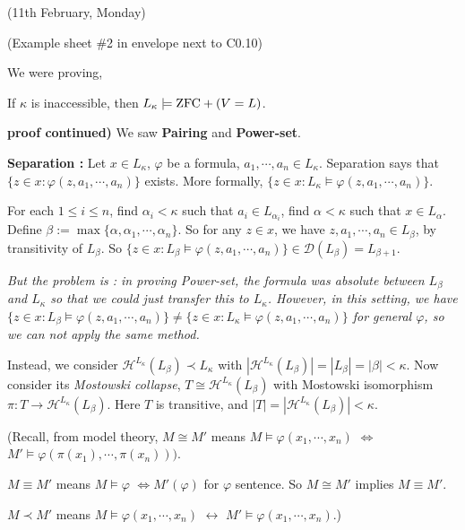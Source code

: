 \documentclass[12pt,a4paper]{article}
\newenvironment{proof}
{\begin{changemargin}{0.5cm}{0.5cm} 
	}%
	{\end{changemargin}
}
\newenvironment{p}
{\begin{proof} 
	}%
	{\end{proof}
}
\begin{document}
\newday

(11th February, Monday)
\s

(Example sheet \#2 in envelope next to C0.10)
\s

We were proving,

\thm If $\kappa$ is inaccessible, then $L_{\kappa} \models \text{ZFC} + (V=L)$.
\begin{p}
\textbf{proof continued)} We saw \textbf{Pairing} and \textbf{Power-set}.
\s

\textbf{Separation :} Let $x\in L_{\kappa}$, $\varphi$ be a formula, $a_1, \cdots, a_n \in L_{\kappa}$. Separation says that $\{z\in x : \varphi(z, a_1, \cdots, a_n) \}$ exists. More formally, $\{ z\in x : L_{\kappa} \models \varphi(z, a_1, \cdots, a_n) \}$.

\quad For each $1\leq i\leq n$, find $\alpha_i < \kappa$ such that $a_i \in L_{\alpha_i}$, find $\alpha < \kappa$ such that $x\in L_{\alpha}$. Define $\beta := \max \{ \alpha, \alpha_1, \cdots, \alpha_n \}$. So for any $z\in x$, we have $z, a_1, \cdots, a_n \in L_{\beta}$, by transitivity of $L_{\beta}$. So $\{ z\in  x : L_{\beta} \models \varphi(z, a_1, \cdots, a_n) \} \in \mathscr{D}(L_{\beta}) = L_{\beta+1}$.

\quad \emph{But the problem is : in proving Power-set, the formula was absolute between $L_{\beta}$ and $L_{\kappa}$ so that we could just transfer this to $L_{\kappa}$. However, in this setting, we have $\{ z \in x: L_{\beta} \models \varphi(z, a_1, \cdots, a_n) \} \neq \{ z\in x : L_{\kappa}\models \varphi(z, a_1, \cdots, a_n) \}$  for general $\varphi$, so we can not apply the same method.}

\quad Instead, we consider $\mathcal{H}^{L_{\kappa}}(L_{\beta}) \prec L_{\kappa}$ with $|\mathcal{H}^{L_{\kappa}}(L_{\beta})| = |L_{\beta}| = |\beta| < \kappa$. Now consider its \emph{Mostowski collapse}, $T \cong \mathcal{H}^{L_{\kappa}}(L_{\beta})$ with Mostowski isomorphism $\pi : T \rightarrow \mathcal{H}^{L_{\kappa}}(L_{\beta})$. Here $T$ is transitive, and $|T| = |\mathcal{H}^{L_{\kappa}}(L_{\beta})| < \kappa$.

(Recall, from model theory, $M\cong M'$ means $M\models \varphi (x_1, \cdots, x_n)$ $\Leftrightarrow$ $M' \models \varphi(\pi (x_1), \cdots, \pi(x_n)))$.

\quad $M\equiv M'$ means $M\models \varphi$ $\Leftrightarrow M'(\varphi)$ for $\varphi$ sentence. So $M \cong M'$ implies $M \equiv M'$.

\quad $M\prec M'$ means $M\models \varphi(x_1, \cdots, x_n)$ $\leftrightarrow$ $M' \models \varphi(x_1, \cdots, x_n)$.)


\end{p}
\end{document}
